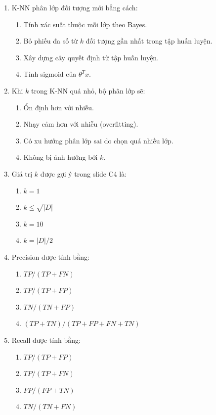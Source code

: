 \documentclass[10pt]{article}
\begin{document}
\begin{enumerate}[leftmargin=*, label=\textbf{Câu \arabic*.}]
    \item K-NN phân lớp đối tượng mới bằng cách:
    \begin{enumerate}[label=\Alph*.]
        \item Tính xác suất thuộc mỗi lớp theo Bayes.
        \item Bỏ phiếu đa số từ $k$ đối tượng gần nhất trong tập huấn luyện.
        \item Xây dựng cây quyết định từ tập huấn luyện.
        \item Tính sigmoid của $\theta^Tx$.
    \end{enumerate}

    \item Khi $k$ trong K-NN quá nhỏ, bộ phân lớp sẽ:
    \begin{enumerate}[label=\Alph*.]
        \item Ổn định hơn với nhiễu.
        \item Nhạy cảm hơn với nhiễu (overfitting).
        \item Có xu hướng phân lớp sai do chọn quá nhiều lớp.
        \item Không bị ảnh hưởng bởi $k$.
    \end{enumerate}

    \item Giá trị $k$ được gợi ý trong slide C4 là:
    \begin{enumerate}[label=\Alph*.]
        \item $k = 1$
        \item $k \leq \sqrt{|D|}$
        \item $k = 10$
        \item $k = |D| / 2$
    \end{enumerate}

    \item Precision được tính bằng:
    \begin{enumerate}[label=\Alph*.]
        \item $TP / (TP + FN)$
        \item $TP / (TP + FP)$
        \item $TN / (TN + FP)$
        \item $(TP + TN) / (TP + FP + FN + TN)$
    \end{enumerate}

    \item Recall được tính bằng:
    \begin{enumerate}[label=\Alph*.]
        \item $TP / (TP + FP)$
        \item $TP / (TP + FN)$
        \item $FP / (FP + TN)$
        \item $TN / (TN + FN)$
    \end{enumerate}


\end{enumerate}
\end{document}
